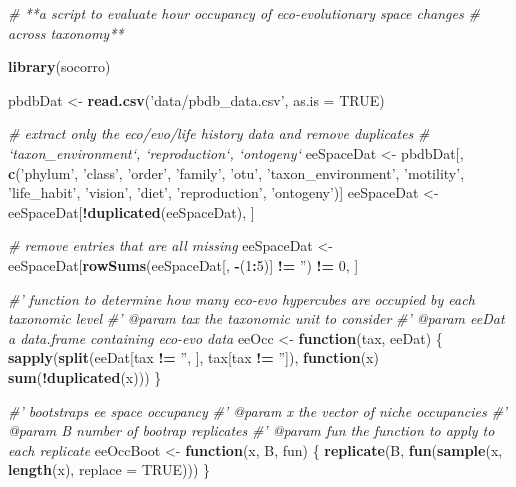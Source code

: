\documentclass[]{article}
\newenvironment{Shaded}{\begin{snugshade}}{\end{snugshade}}
\newcommand{\KeywordTok}[1]{\textcolor[rgb]{0.13,0.29,0.53}{\textbf{#1}}}
\newcommand{\DataTypeTok}[1]{\textcolor[rgb]{0.13,0.29,0.53}{#1}}
\newcommand{\DecValTok}[1]{\textcolor[rgb]{0.00,0.00,0.81}{#1}}
\newcommand{\StringTok}[1]{\textcolor[rgb]{0.31,0.60,0.02}{#1}}
\newcommand{\CommentTok}[1]{\textcolor[rgb]{0.56,0.35,0.01}{\textit{#1}}}
\newcommand{\OtherTok}[1]{\textcolor[rgb]{0.56,0.35,0.01}{#1}}
\newcommand{\ControlFlowTok}[1]{\textcolor[rgb]{0.13,0.29,0.53}{\textbf{#1}}}
\newcommand{\OperatorTok}[1]{\textcolor[rgb]{0.81,0.36,0.00}{\textbf{#1}}}
\newcommand{\NormalTok}[1]{#1}
\begin{document}
\begin{Shaded}
\begin{Highlighting}[]
\CommentTok{# **a script to evaluate hour occupancy of eco-evolutionary space changes }
\CommentTok{# across taxonomy**}

\KeywordTok{library}\NormalTok{(socorro)}

\NormalTok{pbdbDat <-}\StringTok{ }\KeywordTok{read.csv}\NormalTok{(}\StringTok{'data/pbdb_data.csv'}\NormalTok{, }\DataTypeTok{as.is =} \OtherTok{TRUE}\NormalTok{)}

\CommentTok{# extract only the eco/evo/life history data and remove duplicates}
\CommentTok{# `taxon_environment`, `reproduction`, `ontogeny`}
\NormalTok{eeSpaceDat <-}\StringTok{ }\NormalTok{pbdbDat[, }\KeywordTok{c}\NormalTok{(}\StringTok{'phylum'}\NormalTok{, }\StringTok{'class'}\NormalTok{, }\StringTok{'order'}\NormalTok{, }\StringTok{'family'}\NormalTok{, }\StringTok{'otu'}\NormalTok{, }
                          \StringTok{'taxon_environment'}\NormalTok{, }\StringTok{'motility'}\NormalTok{, }\StringTok{'life_habit'}\NormalTok{,}
                          \StringTok{'vision'}\NormalTok{, }\StringTok{'diet'}\NormalTok{, }\StringTok{'reproduction'}\NormalTok{, }\StringTok{'ontogeny'}\NormalTok{)]}
\NormalTok{eeSpaceDat <-}\StringTok{ }\NormalTok{eeSpaceDat[}\OperatorTok{!}\KeywordTok{duplicated}\NormalTok{(eeSpaceDat), ]}

\CommentTok{# remove entries that are all missing}
\NormalTok{eeSpaceDat <-}\StringTok{ }\NormalTok{eeSpaceDat[}\KeywordTok{rowSums}\NormalTok{(eeSpaceDat[, }\OperatorTok{-}\NormalTok{(}\DecValTok{1}\OperatorTok{:}\DecValTok{5}\NormalTok{)] }\OperatorTok{!=}\StringTok{ ''}\NormalTok{) }\OperatorTok{!=}\StringTok{ }\DecValTok{0}\NormalTok{, ]}


\CommentTok{#' function to determine how many eco-evo hypercubes are occupied by each taxonomic level}
\CommentTok{#' @param tax the taxonomic unit to consider}
\CommentTok{#' @param eeDat a data.frame containing eco-evo data}
\NormalTok{eeOcc <-}\StringTok{ }\ControlFlowTok{function}\NormalTok{(tax, eeDat) \{}
    \KeywordTok{sapply}\NormalTok{(}\KeywordTok{split}\NormalTok{(eeDat[tax }\OperatorTok{!=}\StringTok{ ''}\NormalTok{, ], tax[tax }\OperatorTok{!=}\StringTok{ ''}\NormalTok{]), }
           \ControlFlowTok{function}\NormalTok{(x) }\KeywordTok{sum}\NormalTok{(}\OperatorTok{!}\KeywordTok{duplicated}\NormalTok{(x)))}
\NormalTok{\}}

\CommentTok{#' bootstraps ee space occupancy}
\CommentTok{#' @param x the vector of niche occupancies}
\CommentTok{#' @param B number of bootrap replicates}
\CommentTok{#' @param fun the function to apply to each replicate}
\NormalTok{eeOccBoot <-}\StringTok{ }\ControlFlowTok{function}\NormalTok{(x, B, fun) \{}
    \KeywordTok{replicate}\NormalTok{(B, }\KeywordTok{fun}\NormalTok{(}\KeywordTok{sample}\NormalTok{(x, }\KeywordTok{length}\NormalTok{(x), }\DataTypeTok{replace =} \OtherTok{TRUE}\NormalTok{)))}
\NormalTok{\}}



\end{Highlighting}
\end{Shaded}
\end{document}
